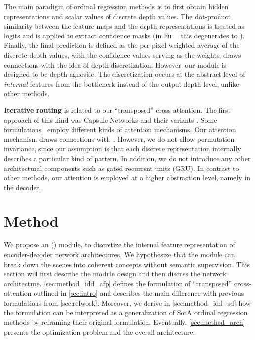 The main paradigm of ordinal regression methods is to first obtain hidden representations and scalar values of discrete depth values. The dot-product similarity between the feature maps and the depth representations is treated as logits and  is applied to extract confidence masks (in Fu~\etal~\cite{Fu2018} this degenerates to ). Finally, the final  prediction is defined as the per-pixel weighted average of the discrete depth values, with the confidence values serving as the weights. \ourmodel draws connections with the idea of depth discretization. However, our \ourmodule module is designed to be depth-agnostic. The discretization occurs at the abstract level of \emph{internal} features from the \ourmodule bottleneck instead of the output depth level, unlike other methods.

\noindent{}\textbf{Iterative routing} is related to our ``transposed'' cross-attention. The first approach of this kind was Capsule Networks and their variants \cite{Sabour2017, Hinton2018capsule}. Some formulations~\cite{Tsai2020capsules, Locatello2020} employ different kinds of attention mechanisms. Our attention mechanism draws connections with~\cite{Locatello2020}. However, we do not allow permutation invariance, since our assumption is that each discrete representation internally describes a particular kind of pattern. In addition, we do not introduce any other architectural components such as gated recurrent units (GRU). In contrast to other methods, our attention is employed at a higher abstraction level, namely in the decoder.

\section{Method}
\label{sec:method}

We propose an \ourmodulename (\ourmodule) module, to discretize the internal feature representation of encoder-decoder network architectures. We hypothesize that the module can break down the scenes into coherent concepts without semantic supervision. This section will first describe the module design and then discuss the network architecture. \cref{sec:method_idd_afp} defines the formulation of ``transposed'' cross-attention outlined in \cref{sec:intro} and describes the main difference with previous formulations from \cref{sec:relwork}. Moreover, we derive in \cref{sec:method_idd_sd} how the \ourmodel formulation can be interpreted as a generalization of SotA ordinal regression methods by reframing their original formulation. Eventually, \cref{sec:method_arch} presents the optimization problem and the overall architecture.


